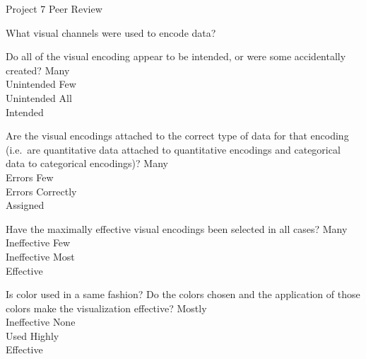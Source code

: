 \documentclass[a4paper,12pt]{article}
\begin{document}
\newpage


\begin{center}
{\huge Project 7 Peer Review}
\end{center}





	{What visual channels were used to encode data? }
    { 
    }
        
	{Do all of the visual encoding appear to be intended, or were some accidentally created?}
        {\choice Many\\Unintended}
        {\choice Few\\Unintended}
        {\choice All\\Intended} 
        
	{Are the visual encodings attached to the correct type of data for that 
    	encoding (i.e.\ are quantitative data attached to quantitative 
        encodings and categorical data to categorical encodings)?}
    {\choice Many\\Errors}
    {\choice Few\\Errors}
    {\choice Correctly\\Assigned} 
            
	{Have the maximally effective visual encodings been selected in all cases? }
    {\choice Many\\Ineffective}
    {\choice Few\\Ineffective}
    {\choice Most\\Effective} 
        
	{Is color used in a same fashion? Do the colors chosen and the application 
    	of those colors make the visualization effective?}
    {\choice Mostly\\Ineffective}
    {\choice None\\Used}
    {\choice Highly\\Effective} 
\end{document}
